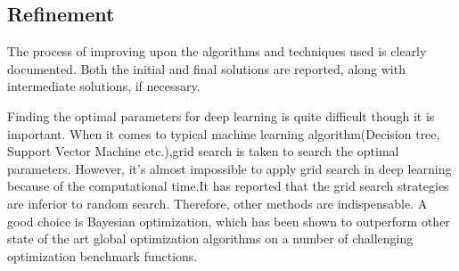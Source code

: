 \subsection{Refinement}
The process of improving upon the algorithms and techniques used is clearly documented. Both the initial and final solutions are reported, along with intermediate solutions, if necessary.

Finding the optimal parameters for deep learning is quite difficult though it is important. When it comes to typical machine learning algorithm(Decision tree, Support Vector Machine etc.),grid search is taken to search the optimal parameters. However, it's almost impossible to apply grid search in deep learning because of the computational time.It has reported that the grid search strategies are inferior to random search.\cite{Random} Therefore, other methods are indispensable. A good choice is Bayesian optimization, which has been shown to outperform other state of the art global optimization algorithms on a number of challenging optimization benchmark functions.

